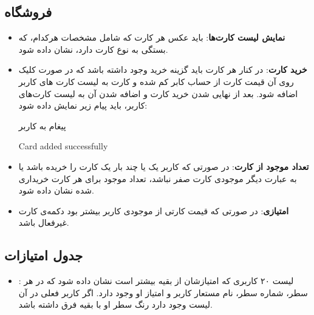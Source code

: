 \documentclass[]{article}
\begin{document}
\subsection*{{\titr فروشگاه}}

\begin{itemize}
    \item \textbf{نمایش لیست کارت‌ها}:
     باید عکس هر کارت که شامل مشخصات هر‌کدام، که بستگی به نوع کارت دارد، نشان داده شود.
     
    \item \textbf{خرید کارت}:
     در کنار هر کارت باید گزینه خرید وجود داشته باشد که در صورت کلیک روی آن قیمت کارت از حساب کابر کم شده و کارت به لیست کارت های کاربر اضافه شود. بعد از نهایی شدن خرید کارت و اضافه شدن آن به لیست کارت‌های کاربر، باید پیام زیر نمایش داده شود:
     
     
     
     \begin{mybox}[colback=yellow]{پیغام به کاربر}
     	\begin{latin}	
     		Card added successfully
     	\end{latin}
     \end{mybox}
     
    \item \textbf{تعداد موجود از کارت}:
     در صورتی که کاربر یک یا چند بار یک کارت را خریده باشد یا به عبارت دیگر موجودی کارت صفر نباشد، تعداد موجود برای هر کارت خریداری شده نشان داده شود.
     
    \item \textbf{امتیازی}: در صورتی که قیمت کارتی از موجودی کاربر بیشتر بود دکمه‌ی  کارت غیر‌فعال باشد.
\end{itemize}

\subsection*{{\titr جدول امتیازات}}

\begin{itemize}
    \item {}: 
     لیست ۲۰ کاربری که امتیازشان از بقیه بیشتر است نشان داده شود که در هر سطر، شماره سطر،  نام مستعار کاربر و امتیاز او وجود دارد. اگر کاربر فعلی در آن لیست وجود دارد رنگ سطر او با بقیه فرق داشته باشد.
\end{itemize}
\end{document}
